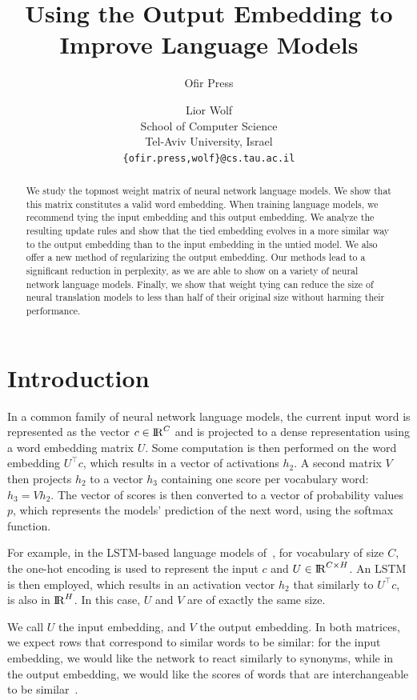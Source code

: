 \documentclass[11pt]{article}
\title{Using the Output Embedding to Improve Language Models}
\author{Ofir Press \and   Lior Wolf \\
  School of Computer Science\\
  Tel-Aviv University, Israel \\
  {\tt \{ofir.press,wolf\}@cs.tau.ac.il} 
}
\date{}
\begin{document}
\setlength{\abovedisplayskip}{3pt}
\setlength{\belowdisplayskip}{3pt}


\maketitle
\begin{abstract}
We study the topmost weight matrix of neural network language models. We show that this matrix constitutes a valid word embedding. When training language models, we recommend tying the input embedding and this output embedding. We analyze the resulting update rules and show that the tied embedding evolves in a more similar way to the output embedding than to the input embedding in the untied model. We also offer a new method of regularizing the output embedding. Our methods lead to a significant reduction in perplexity, as we are able to show on a variety of neural network language models. Finally, we show that weight tying can reduce the size of neural translation models to less than half of their original size without harming their performance. 
\end{abstract}



\section{Introduction}

In a common family of neural network language models, the current input word is represented as the vector $c\in {\rm I\!R}^{C}$ and is projected to a dense representation using a word embedding matrix $U$. Some computation is then performed on the word embedding $U^\top c$, which results in a vector of activations $h_2$. A second matrix $V$ then projects $h_2$ to a vector $h_3$ containing one score per vocabulary word: $h_3=V h_2  $. The vector of scores is then converted to a vector of probability values $p$, which represents the models' prediction of the next word, using the softmax function.

For example, in the LSTM-based language models of~\cite{sundermeyer12:lstm,zaremba14}, for vocabulary of size $C$, the one-hot encoding is used to represent the input $c$ and $U \in {\rm I\!R}^{C \times H}$. An LSTM is then employed, which results in an activation vector $h_2$ that similarly to $U^\top c$, is also in ${\rm I\!R} ^ H$. %
In this case, $U$ and $V$ are of exactly the same size.

We call $U$ the input embedding, and $V$ the output embedding. In both matrices, we expect rows that correspond to similar words to be similar: for the input embedding, we would like the network to react similarly to synonyms, while in the output embedding, we would like the scores of words that are interchangeable to be similar~\cite{mnih2012fast}.
\end{document}
